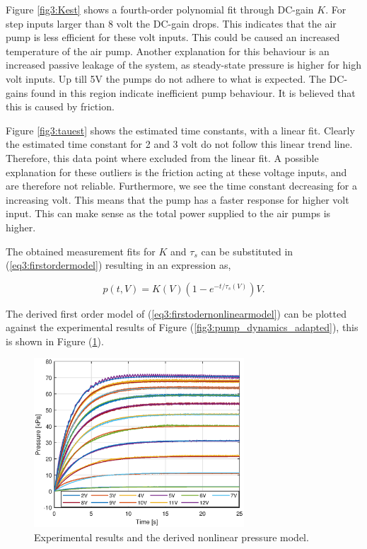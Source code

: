 Figure \ref{fig3:Kest} shows a fourth-order polynomial fit through DC-gain $K$. For step inputs larger than 8 volt the DC-gain drops. This indicates that the air pump is less efficient for these volt inputs. This could be caused an increased temperature of the air pump. Another explanation for this behaviour is an increased passive leakage of the system, as steady-state pressure is higher for high volt inputs. Up till 5V the pumps do not adhere to what is expected. The DC-gains found in this region indicate inefficient pump behaviour. It is believed that this is caused by friction.

Figure \ref{fig3:tauest} shows the estimated time constants, with a linear fit. Clearly the estimated time constant for 2 and 3 volt do not follow this linear trend line. Therefore, this data point where excluded from the linear fit. A possible explanation for these outliers is the friction acting at these voltage inputs, and are therefore not reliable. Furthermore, we see the time constant decreasing for a increasing volt. This means that the pump has a faster response for higher volt input. This can make sense as the total power supplied to the air pumps is higher. 


The obtained measurement fits for $K$ and $\tau_s$ can be substituted in (\ref{eq3:firstordermodel}) resulting in an expression as,

\begin{equation}
    p(t,V) = K(V)(1-e^{-t/\tau_s(V)})V.
    \label{eq3:firstodernonlinearmodel}
    \end{equation}

The derived first order model of (\ref{eq3:firstodernonlinearmodel}) can be plotted against the experimental results of Figure (\ref{fig3:pump_dynamics_adapted}), this is shown in Figure (\ref{fig3:expvsfitpres}).

\newpage

\begin{figure}[H]
    \centering
    \includegraphics[width = 0.7\textwidth]{Figures/Chapter3/expfit.eps}
    \caption{Experimental results and the derived nonlinear pressure model.}
    \label{fig3:expvsfitpres}
\end{figure}

